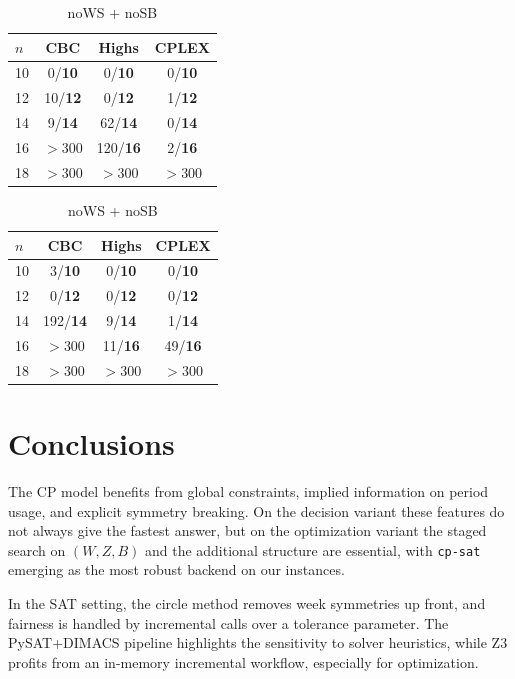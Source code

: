 \documentclass{article}
\begin{document}
\begin{table}[H]\centering\small
\begin{minipage}{.48\textwidth}\centering
\begin{tabular}{l|ccc}\toprule
$n$ & CBC & Highs & CPLEX\\\midrule
10 & 0/\textbf{10} & 0/\textbf{10} & 0/\textbf{10}\\
12 & 10/\textbf{12} & 0/\textbf{12} & 1/\textbf{12}\\
14 & 9/\textbf{14} & 62/\textbf{14} & 0/\textbf{14}\\
16 & \(>300\) & 120/\textbf{16} & 2/\textbf{16}\\
18 & \(>300\) & \(>300\) & \(>300\)\\\bottomrule
\end{tabular}
\caption{noWS (SB on)}
\end{minipage}\hfill
\begin{minipage}{.48\textwidth}\centering
\begin{tabular}{l|ccc}\toprule
$n$ & CBC & Highs & CPLEX\\\midrule
10 & 3/\textbf{10} & 0/\textbf{10} & 0/\textbf{10}\\
12 & 0/\textbf{12} & 0/\textbf{12} & 0/\textbf{12}\\
14 & 192/\textbf{14} & 9/\textbf{14} & 1/\textbf{14}\\
16 & \(>300\) & 11/\textbf{16} & 49/\textbf{16}\\
18 & \(>300\) & \(>300\) & \(>300\)\\\bottomrule
\end{tabular}
\caption{noWS + noSB}
\end{minipage}
\end{table}


\section{Conclusions}

The CP model benefits from global constraints, implied information on period
usage, and explicit symmetry breaking. On the decision variant these features
do not always give the fastest answer, but on the optimization variant the
staged search on $(W,Z,B)$ and the additional structure are essential, with 
\texttt{cp-sat} emerging as the most robust backend on our
instances.

In the SAT setting, the circle method removes week symmetries up front, and
fairness is handled by incremental calls over a tolerance parameter. The
PySAT+DIMACS pipeline highlights the sensitivity to solver heuristics, while
Z3 profits from an in-memory incremental workflow, especially for
optimization. 
\end{document}
